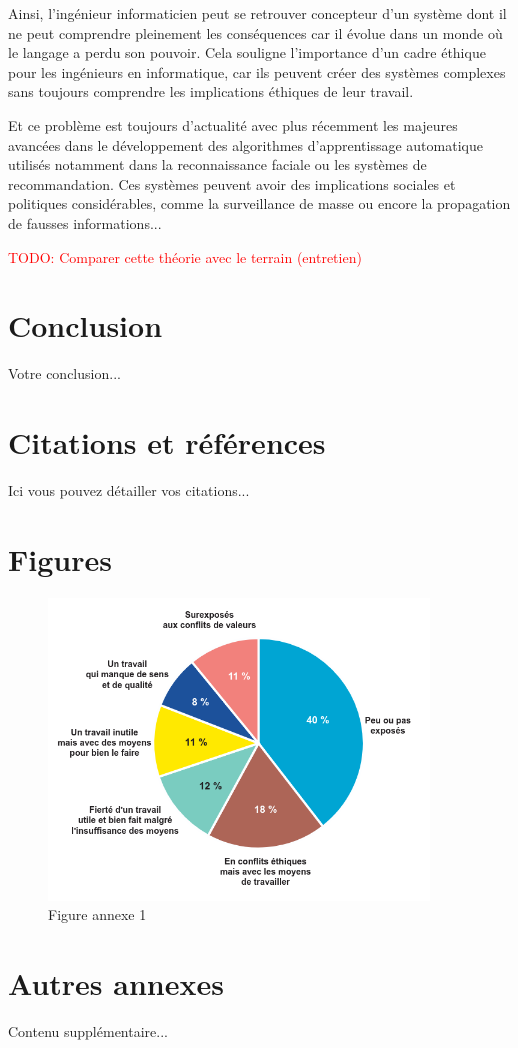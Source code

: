 \documentclass[12pt,a4paper]{report}
\begin{document}
Ainsi, l'ingénieur informaticien peut se retrouver concepteur d'un système dont il ne peut comprendre pleinement les conséquences car il évolue dans un monde où le langage a perdu son pouvoir. Cela souligne l'importance d'un cadre éthique pour les ingénieurs en informatique, car ils peuvent créer des systèmes complexes sans toujours comprendre les implications éthiques de leur travail.

Et ce problème est toujours d'actualité avec plus récemment les majeures avancées dans le développement des algorithmes d'apprentissage automatique utilisés notamment dans la reconnaissance faciale ou les systèmes de recommandation. Ces systèmes peuvent avoir des implications sociales et politiques considérables, comme la surveillance de masse ou encore la propagation de fausses informations...

\textcolor{red}{TODO: Comparer cette théorie avec le terrain (entretien)}

\chapter{Conclusion}

Votre conclusion...

\printbibliography[heading=bibintoc,title=Bibliographie]

\appendix

\chapter{Citations et références}
Ici vous pouvez détailler vos citations...

\chapter{Figures}
\begin{figure}[h]
    \centering
    \includegraphics[width=0.9\textwidth]{./assets/conflits-de-valeurs-au-travail-graphique.png}
    \caption{Figure annexe 1}
\end{figure}

\chapter{Autres annexes}
Contenu supplémentaire...
\end{document}
